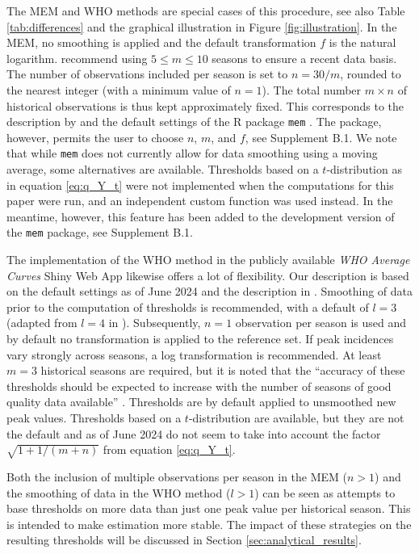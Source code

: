 \documentclass[12pt]{article}
\begin{document}
\noindent The MEM and WHO methods are special cases of this procedure, see also Table \ref{tab:differences} and the graphical illustration in Figure \ref{fig:illustration}. In the MEM, no smoothing is applied and the default transformation $f$ is the natural logarithm.  \cite{Vega2015} recommend using $5 \leq m \leq 10$ seasons to ensure a recent data basis. The number of observations included per season is set to $n = 30/m$, rounded to the nearest integer (with a minimum value of $n = 1$). The total number $m \times n$ of historical observations is thus kept approximately fixed. This corresponds to the description by \cite{Vega2015} and the default settings of the R package \texttt{mem} \citep{Lozano2020}. The package, however, permits the user to choose $n$, $m$, and $f$, see Supplement B.1. We note that while \texttt{mem} does not currently allow for data smoothing using a moving average, some alternatives are available. Thresholds based on a $t$-distribution as in equation \eqref{eq:q_Y_t} were not implemented when the computations for this paper were run, and an independent custom function was used instead. In the meantime, however, this feature has been added to the development version of the \texttt{mem} package, see Supplement B.1.

The implementation of the WHO method in the publicly available \textit{WHO Average Curves} Shiny Web App \citep{WHO2023} likewise offers a lot of flexibility. Our description is based on the default settings as of June 2024 and the description in \cite{WHO2014}. Smoothing of data prior to the computation of thresholds is recommended, with a default of $l = 3$ (adapted from $l = 4$ in \citealt[p68]{WHO2014}). Subsequently, $n = 1$ observation per season is used and by default no transformation is applied to the reference set. If peak incidences vary strongly across seasons, a log transformation is recommended. At least $m = 3$ historical seasons are required, but it is noted that the ``accuracy of these thresholds should be expected to increase with the number of seasons of good quality data available'' \cite[p22]{WHO2023}. Thresholds are by default applied to unsmoothed new peak values. Thresholds based on a $t$-distribution are available, but they are not the default and as of June 2024 do not seem to take into account the factor $\sqrt{1 + 1/(m + n)}$ from equation \eqref{eq:q_Y_t}.


Both the inclusion of multiple observations per season in the MEM ($n > 1$) and the smoothing of data in the WHO method ($l > 1$) can be seen as attempts to base thresholds on more data than just one peak value per historical season. This is intended to make estimation more stable. The impact of these strategies on the resulting thresholds will be discussed in Section \ref{sec:analytical_results}.
\end{document}

